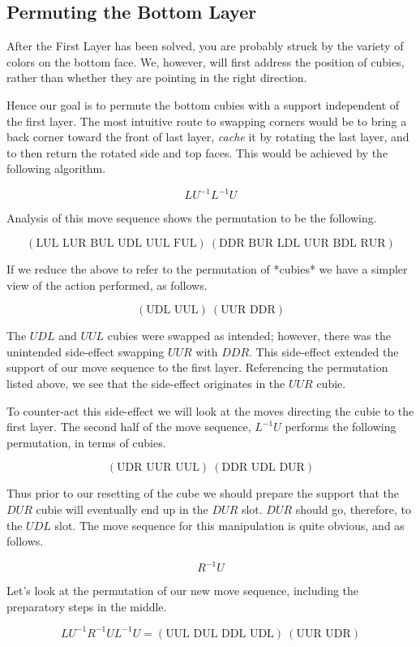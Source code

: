 \documentclass{article}
\begin{document}
\subsection{Permuting the Bottom Layer}
After the First Layer has been solved, you are probably struck by the variety 
of colors on the bottom face. We, however, will first address the position of 
cubies, rather than whether they are pointing in the right direction.

Hence our goal is to permute the bottom cubies with a support independent of 
the first layer. The most intuitive route to swapping corners would be to 
bring a back corner toward the front of last layer, \emph{cache} it by 
rotating the last layer, and to then return the rotated side and top faces. 
This would be achieved by the following algorithm.

$$L U^{-1} L^{-1} U$$

Analysis of this move sequence shows the permutation to be the following.

$$(\text{LUL LUR BUL UDL UUL FUL})\ (\text{DDR BUR LDL UUR BDL RUR})$$

If we reduce the above to refer to the permutation of *cubies* we have a simpler view of the action performed, as follows.

$$(\text{UDL UUL})\ (\text{UUR DDR})$$

The $UDL$ and $UUL$ cubies were swapped as intended; however, there was the 
unintended side-effect swapping $UUR$ with $DDR$. This side-effect extended 
the support of our move sequence to the first layer. Referencing the 
permutation listed above, we see that the side-effect originates in the $UUR$ 
cubie.

To counter-act this side-effect we will look at the moves directing the cubie 
to the first layer. The second half of the move sequence, $L^{-1} U$ performs 
the following permutation, in terms of cubies.

$$(\text{UDR UUR UUL})\ (\text{DDR UDL DUR})$$

Thus prior to our resetting of the cube we should prepare the support that the $DUR$ cubie will eventually end up in the $DUR$ slot. $DUR$ should go, therefore, to the $UDL$ slot. The move sequence for this manipulation is quite obvious, and as follows.

$$R^{-1} U$$

Let's look at the permutation of our new move sequence, including the 
preparatory steps in the middle.

$$L U^{-1} R^{-1} U L^{-1} U = (\text{UUL DUL DDL UDL})\ (\text{UUR UDR})$$
\end{document}
